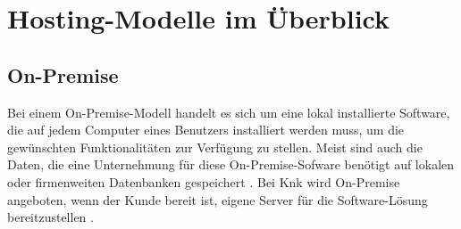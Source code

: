 \documentclass[12pt,bibtotoc]{article}
\begin{document}
	\section{Hosting-Modelle im Überblick}
		\subsection{On-Premise}
		Bei einem On-Premise-Modell handelt es sich um eine lokal installierte Software, die auf jedem Computer eines Benutzers installiert werden muss, um die gewünschten Funktionalitäten zur Verfügung zu stellen.
		Meist sind auch die Daten, die eine Unternehmung für diese On-Premise-Sofware benötigt auf lokalen oder firmenweiten Datenbanken gespeichert \cite{AlHayek.2020}. 
		Bei Knk wird On-Premise angeboten, wenn der Kunde bereit ist, eigene Server für die Software-Lösung bereitzustellen \cite{Anhang}.
\end{document}
